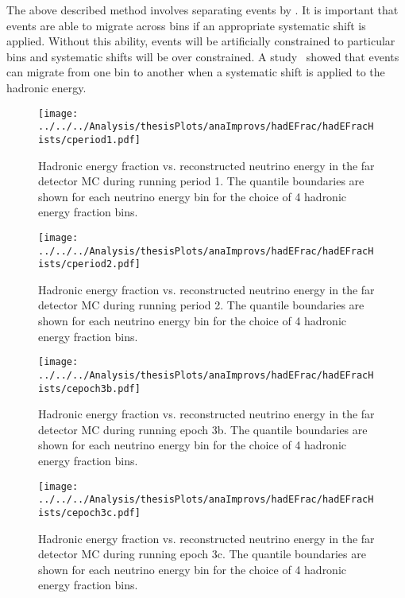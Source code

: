 The above described method involves separating events by \hadefrac{}.
It is important that events are able to migrate across \hadefrac{}
bins if an appropriate systematic shift is applied. 
Without this ability, events will be artificially constrained to
particular \hadefrac{} bins and systematic shifts will be over
constrained.
A study~\cite{hadEFracMigration} showed that events can migrate from one
\hadefrac{} bin to another when a systematic shift is applied to the hadronic
energy.

\begin{figure}
  \centering
  \texttt{[image: ../../../Analysis/thesisPlots/anaImprovs/hadEFrac/hadEFracHists/cperiod1.pdf]}
  \caption{Hadronic energy fraction vs. reconstructed neutrino
    energy in the far detector MC during running period 1. The
    quantile boundaries are shown for each neutrino energy bin for
    the choice of 4 hadronic energy fraction bins. } 
  \label{fig:hadEFracHistP1}
\end{figure}
\begin{figure}
  \centering
  \texttt{[image: ../../../Analysis/thesisPlots/anaImprovs/hadEFrac/hadEFracHists/cperiod2.pdf]}
  \caption{Hadronic energy fraction vs. reconstructed neutrino
    energy in the far detector MC during running period 2. 
    The quantile boundaries are shown for each neutrino energy bin
    for the choice of 4 hadronic energy fraction bins.
  } 
  \label{fig:hadEFracHistP2}
\end{figure}
\begin{figure}
  \centering
  \texttt{[image: ../../../Analysis/thesisPlots/anaImprovs/hadEFrac/hadEFracHists/cepoch3b.pdf]}
  \caption{Hadronic energy fraction vs. reconstructed neutrino
    energy in the far detector MC during running epoch 3b.
    The quantile boundaries are shown for each neutrino energy bin
    for the choice of 4 hadronic energy fraction bins.  } 
  \label{fig:hadEFracHistE3b}
\end{figure}
\begin{figure}
  \centering
  \texttt{[image: ../../../Analysis/thesisPlots/anaImprovs/hadEFrac/hadEFracHists/cepoch3c.pdf]}
  \caption{Hadronic energy fraction vs. reconstructed neutrino
    energy in the far detector MC during running epoch 3c. 
    The quantile boundaries are shown for each neutrino energy bin
    for the choice of 4 hadronic energy fraction bins.  } 
  \label{fig:hadEFracHistE3c}
\end{figure}



